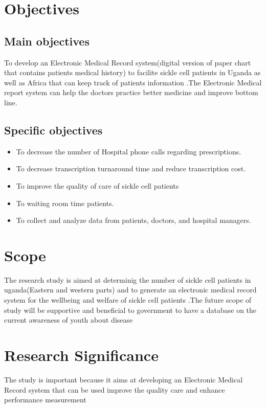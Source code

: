 \documentclass[12pt,]{article}
\begin{document}
\section{Objectives}

\subsection{Main objectives}
To develop an Electronic Medical Record system(digital version of paper chart that contains patients  medical history) to facilite sickle cell patients in Uganda as well as Africa that can keep track of patients information .The Electronic Medical report system can help the doctors practice better medicine and improve bottom line.

\subsection{Specific objectives}
\begin{itemize}
\item To decrease the number of Hospital phone calls regarding prescriptions.
\item To decrease transcription turnaround time and reduce transcription cost.
\item To improve the quality of care of sickle cell patients
\item To waiting room time patients.
\item To collect and analyze data from patients, doctors, and hospital managers.
\end{itemize}

\section{Scope}
The research study is aimed at determinig the number of sickle cell patients in uganda(Eastern and western parts) and to generate an electronic medical record system  for the wellbeing and welfare of sickle cell patients .The future scope of  study will be supportive and beneficial to government to have a database on the current awareness of youth about disease


\section{Research Significance}
The study is important because it aims at developing an Electronic Medical Record system that can be used improve the quality care and enhance performance measurement
\end{document}
